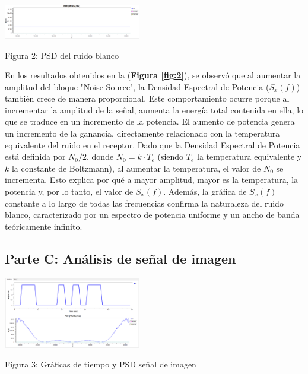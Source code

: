 \documentclass{journal}[IEEEtran, twocolumn]             %
\begin{document}
\begin{multicols}{2}
    \begin{center}
    \includegraphics[width=0.45\textwidth]{figs/F3.png}
    \caption{Figura 2: PSD del ruido blanco}
    \label{fig:2}
    \end{center}

En los resultados obtenidos en la (\textbf{Figura \ref{fig:2}}), se observó que al aumentar la amplitud del bloque "Noise Source", la Densidad Espectral de Potencia ($S_x(f)$) también crece de manera proporcional. Este comportamiento ocurre porque al incrementar la amplitud de la señal, aumenta la energía total contenida en ella, lo que se traduce en un incremento de la potencia. El aumento de potencia genera un incremento de la ganancia, directamente relacionado con la temperatura equivalente del ruido en el receptor. Dado que la Densidad Espectral de Potencia está definida por $N_0/2$, donde $N_0 = k \cdot T_e$ (siendo $T_e$ la temperatura equivalente y $k$ la constante de Boltzmann), al aumentar la temperatura, el valor de $N_0$ se incrementa. Esto explica por qué a mayor amplitud, mayor es la temperatura, la potencia y, por lo tanto, el valor de $S_x(f)$. Además, la gráfica de $S_x(f)$ constante a lo largo de todas las frecuencias confirma la naturaleza del ruido blanco, caracterizado por un espectro de potencia uniforme y un ancho de banda teóricamente infinito. \cite{libro1}


\subsection{Parte C: Análisis de señal de imagen}

    \begin{center}
    \includegraphics[width=0.45\textwidth]{figs/F4.png}
    \caption{Figura 3: Gráficas de tiempo y PSD señal de imagen}
    \label{fig:3}
    \end{center}



\end{multicols}
\end{document}
